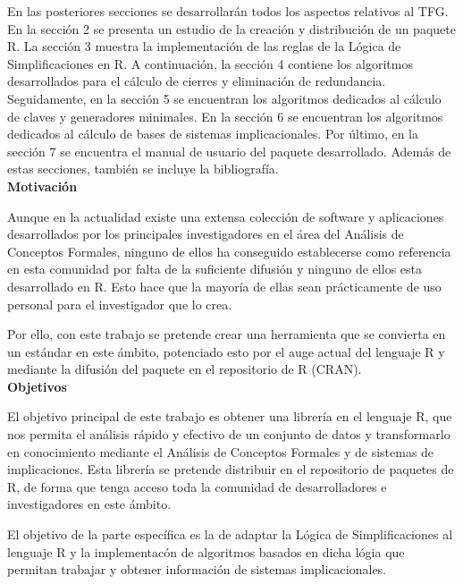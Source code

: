 En las posteriores secciones se desarrollar\'an todos los aspectos relativos al TFG. En la secci\'on 2 se presenta un estudio de la creaci\'on y distribuci\'on de un paquete R. La secci\'on 3 muestra la implementaci\'on de las reglas de la L\'ogica de Simplificaciones en R. A continuaci\'on, la secci\'on 4 contiene los algoritmos desarrollados para el c\'alculo de cierres y eliminaci\'on de redundancia. Seguidamente, en la secci\'on 5 se encuentran los algoritmos dedicados al c\'alculo de claves y generadores minimales. En la secci\'on 6 se encuentran los algoritmos dedicados al c\'alculo de bases de sistemas implicacionales. Por \'ultimo, en la secci\'on 7 se encuentra el manual de usuario del paquete desarrollado. Adem\'as de estas secciones, tambi\'en se incluye la bibliograf\'ia.\\

\textbf{Motivaci\'on}

Aunque en la actualidad existe una extensa colecci\'on de software y aplicaciones desarrollados por los principales investigadores en el \'area del  An\'alisis de Conceptos Formales, ninguno de ellos ha conseguido establecerse como referencia en esta comunidad por falta de la suficiente difusi\'on y ninguno de ellos esta desarrollado en R. Esto hace que la mayor\'ia de ellas sean pr\'acticamente de uso personal para el investigador que lo crea. 

Por ello, con este trabajo se pretende crear una herramienta que se convierta en un est\'andar en este \'ambito, potenciado esto por el auge actual del lenguaje R y mediante la difusi\'on del paquete en el repositorio de R (CRAN).\\


\textbf{Objetivos}

El objetivo principal de este trabajo es obtener una librer\'ia en el lenguaje R, que nos permita el an\'alisis r\'apido y efectivo de un conjunto de datos y transformarlo en conocimiento mediante el An\'alisis de Conceptos Formales y de sistemas de implicaciones. Esta librer\'ia se pretende distribuir en el repositorio de paquetes de R, de forma que tenga acceso toda la comunidad de desarrolladores e investigadores en este \'ambito. 

El objetivo de la parte espec\'ifica es la de adaptar la L\'ogica de Simplificaciones al lenguaje R y la implementac\'on de algoritmos basados en dicha l\'ogia que permitan trabajar y obtener informaci\'on de sistemas implicacionales.

\newpage